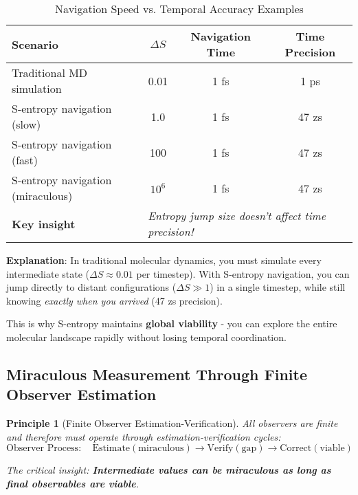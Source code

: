 \documentclass[12pt,a4paper]{article}
\newtheorem{principle}[theorem]{Principle}
\begin{document}
\begin{table}[H]
\centering
\caption{Navigation Speed vs. Temporal Accuracy Examples}
\begin{tabular}{lccc}
\toprule
Scenario & $\Delta S$ & Navigation Time & Time Precision \\
\midrule
Traditional MD simulation & 0.01 & 1 fs & 1 ps \\
S-entropy navigation (slow) & 1.0 & 1 fs & 47 zs \\
S-entropy navigation (fast) & 100 & 1 fs & 47 zs \\
S-entropy navigation (miraculous) & $10^6$ & 1 fs & 47 zs \\
\midrule
\textbf{Key insight} & \multicolumn{3}{l}{\textit{Entropy jump size doesn't affect time precision!}} \\
\bottomrule
\end{tabular}
\end{table}

\textbf{Explanation}: In traditional molecular dynamics, you must simulate every intermediate state ($\Delta S \approx 0.01$ per timestep). With S-entropy navigation, you can jump directly to distant configurations ($\Delta S \gg 1$) in a single timestep, while still knowing \textit{exactly when you arrived} (47 zs precision).

This is why S-entropy maintains \textbf{global viability} - you can explore the entire molecular landscape rapidly without losing temporal coordination.

\subsection{Miraculous Measurement Through Finite Observer Estimation}

\begin{principle}[Finite Observer Estimation-Verification]
All observers are finite and therefore must operate through estimation-verification cycles:
\begin{equation}
\text{Observer Process}: \quad \text{Estimate}(\text{miraculous}) \rightarrow \text{Verify}(\text{gap}) \rightarrow \text{Correct}(\text{viable})
\end{equation}

The critical insight: \textbf{Intermediate values can be miraculous as long as final observables are viable}.
\end{principle}
\end{document}
